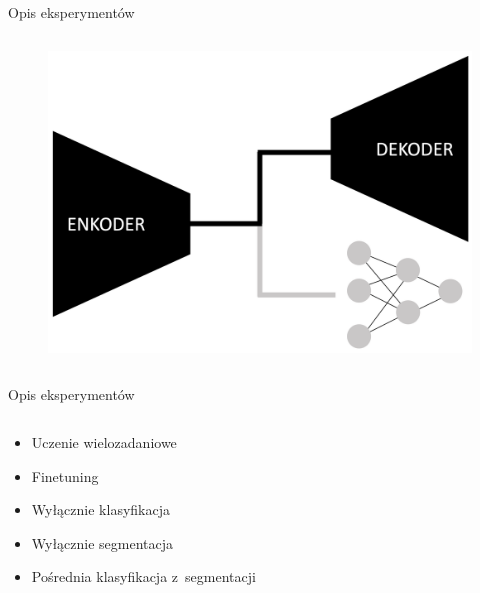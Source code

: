 \documentclass[10pt]{beamer}
\begin{document}
\begin{frame}{Opis eksperymentów}
\begin{columns}
        \begin{column}{0.5\textwidth}
            \begin{figure}
                \includegraphics[width=\textwidth]{images/archs/only-segm.png}
            \end{figure}
        \end{column}
    \end{columns}
\end{frame}\begin{frame}{Opis eksperymentów}
    \begin{columns}
        \begin{column}{0.5\textwidth}
            \begin{itemize}
               \item Uczenie wielozadaniowe
               \item Finetuning
               \item Wyłącznie klasyfikacja
               \item Wyłącznie segmentacja
               \item Pośrednia klasyfikacja z~segmentacji
            \end{itemize}
        \end{column}


\end{columns}
\end{frame}
\end{document}
